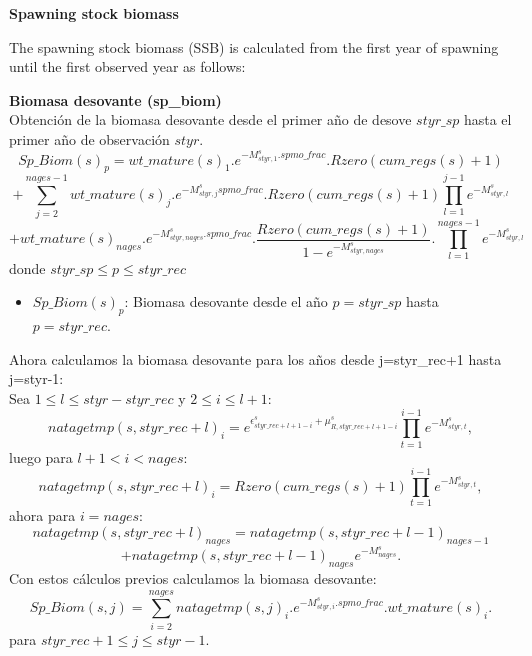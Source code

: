 \documentclass{article}
\begin{document}
\textbf{Spawning stock biomass}

The spawning stock biomass (SSB) is calculated from the first year of spawning until the first observed year as follows:



\textbf{Biomasa desovante (sp\_biom)}\\
Obtención de la biomasa desovante desde el primer año de desove $styr\_sp$ hasta el primer año de observación $styr$.
\begin{equation}
    Sp\_Biom(s)_p=wt\_mature(s)_1.e^{-M^s_{styr,1}.spmo\_frac}.Rzero(cum\_regs(s)+1)
\end{equation}
\begin{equation*}
    +\sum_{j=2}^{nages-1}wt\_mature(s)_j.e^{-M^s_{styr,j} spmo\_frac}.Rzero(cum\_regs(s)+1)\prod_{l=1}^{j-1}e^{-M^s_{styr,l}} 
\end{equation*}
\begin{equation*}
    + wt\_mature(s)_{nages}.e^{-M^s_{styr,nages}.spmo\_frac}.\dfrac{Rzero(cum\_regs(s)+1)}{1-e^{-M^s_{styr,nages}}}.\prod_{l=1}^{nages-1}e^{-M^s_{styr,l}}
\end{equation*}
donde $styr\_sp\leq p \leq styr\_rec$
\begin{itemize}
    \item $Sp\_Biom(s)_p$: Biomasa desovante desde el año $p=styr\_sp$ hasta $p=styr\_rec$.
\end{itemize}

Ahora calculamos la biomasa desovante para los años desde j=styr\_rec+1 hasta j=styr-1:\\

Sea $1\leq l \leq styr-styr\_rec$ y $2\leq i \leq l+1$:
\begin{equation}
natagetmp(s,styr\_rec+l)_i = e^{\epsilon^s_{styr\_rec+l+1-i}+\mu^s_{R,styr\_rec+l+1-i}}\prod_{t=1}^{i-1}e^{-M^s_{styr,t}},
\end{equation}
luego para $l+1< i < nages$:
\begin{equation}
natagetmp(s,styr\_rec+l)_i=Rzero(cum\_regs(s)+1)\prod_{t=1}^{i-1}e^{-M^s_{styr,t}},
\end{equation}
ahora para $i=nages$:
\begin{equation}
natagetmp(s,styr\_rec+l)_{nages}=natagetmp(s,styr\_rec+l-1)_{nages-1}
\end{equation}
\begin{equation*}
    +natagetmp(s,styr\_rec+l-1)_{nages}e^{-M^s_{nages}}.
\end{equation*}
Con estos cálculos previos calculamos la biomasa desovante:
\begin{equation}
    Sp\_Biom(s, j)=\sum_{i=2}^{nages}natagetmp(s,j)_i.e^{-M^s_{styr,i}.spmo\_frac}.wt\_mature(s)_i.
\end{equation}
para $styr\_rec +1 \leq j \leq styr-1$. \\
\end{document}
